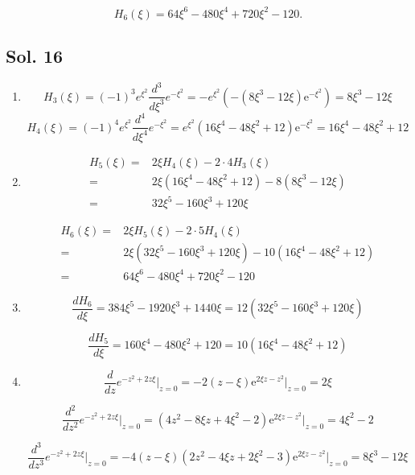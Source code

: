$$H_6(\xi) = 64\xi^6-480\xi^4+720\xi^2-120.$$

\subsection*{Sol. 16}
\begin{enumerate}
    \item 
    $$
    H_3(\xi) = (-1)^3e^{\xi^2}\frac{d^3}{d\xi^3}e^{-\xi^2} = 
    -e^{\xi^2}(-\left(8{\xi}^{3} - 12{\xi}\right) \mathrm{e}^{-{\xi}^{2}}) = 
    8{\xi}^{3} - 12{\xi}
    $$
    $$
    H_4(\xi) = (-1)^4e^{\xi^2}\frac{d^4}{d\xi^4}e^{-\xi^2} = 
    e^{\xi^2}\left(16{\xi}^{4} - 48{\xi}^{2} + 12\right) \mathrm{e}^{-{\xi}^{2}}
    =16{\xi}^{4} - 48{\xi}^{2} + 12
    $$
    \item 
    \begin{align*}
        H_5(\xi) =& 2\xi H_4(\xi) - 2\cdot4 H_3(\xi) \\
        = & 
    2\xi(16{\xi}^{4} - 48{\xi}^{2} + 12)-8(8{\xi}^{3} - 12{\xi}) \\
    = & 32\xi^5-160\xi^3 + 120\xi
    \end{align*}

    \begin{align*}
        H_6(\xi) =& 2\xi H_5(\xi) - 2\cdot5 H_4(\xi) \\
        = & 
    2\xi(32\xi^5-160\xi^3 + 120\xi)-10(16{\xi}^{4} - 48{\xi}^{2} + 12) \\
    = & 64\xi^6-480\xi^4 + 720\xi^2 - 120 
    \end{align*}

    \item 
    $$
    \frac{d H_6}{d\xi} =
    384{\xi}^{5} - 1920{\xi}^{3} + 1440{\xi} = 
    12(32\xi^5-160\xi^3 + 120\xi)
    $$

    $$
    \frac{d H_5}{d\xi} =
    160{\xi}^{4} - 480{\xi}^{2} + 120 = 
    10(16\xi^4-48\xi^2 + 12)
    $$

    \item 
    $$
    \frac{d}{dz}e^{-z^2+2z\xi}\bigg|_{z=0}
    =-2\left(z - {\xi}\right) \mathrm{e}^{2{\xi}z - z^{2}}\bigg|_{z=0}
    =2\xi
    $$

    $$
    \frac{d^2}{dz^2}e^{-z^2+2z\xi}\bigg|_{z=0}
    =\left(4z^{2} - 8{\xi}z + 4{\xi}^{2} - 2\right) \mathrm{e}^{2{\xi}z - z^{2}}\bigg|_{z=0}
    =4{\xi}^{2} - 2
    $$

    $$
    \frac{d^3}{dz^3}e^{-z^2+2z\xi}\bigg|_{z=0}
    =-4 \left(z - {\xi}\right) \left(2z^{2} - 4{\xi}z + 2{\xi}^{2} - 3\right) \mathrm{e}^{2{\xi}z - z^{2}}\bigg|_{z=0}
    =8\xi^3-12\xi
    $$

    
\end{enumerate}

